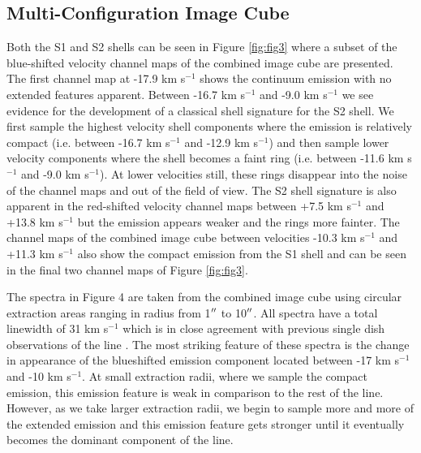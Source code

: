 \documentclass[preprint2]{aastex}
\begin{document}
\subsection{Multi-Configuration Image Cube} \label{results2} 

Both the S1 and S2 shells can be seen in Figure \ref{fig:fig3} where a subset of the blue-shifted velocity channel maps of the combined image cube are presented. The first channel map at -17.9 km s${}^{-1}$ shows the continuum emission with no extended features apparent. Between -16.7 km s${}^{-1}$ and -9.0 km s${}^{-1}$ we see evidence for the development of a classical shell signature for the S2 shell. We first sample the highest velocity shell components where the emission is relatively compact (i.e. between -16.7 km s${}^{-1}$ and -12.9 km s${}^{-1}$) and then sample lower velocity components where the shell becomes a faint ring (i.e. between -11.6 km s${}^{-1}$ and -9.0 km s${}^{-1}$). At lower velocities still, these rings disappear into the noise of the channel maps and out of the field of view. The S2 shell signature is also apparent in the red-shifted velocity channel maps between +7.5 km s${}^{-1}$ and +13.8 km s${}^{-1}$ but the emission appears weaker and the rings more fainter. The channel maps of the combined image cube between velocities -10.3 km s${}^{-1}$ and +11.3 km s${}^{-1}$ also show the compact emission from the S1 shell and can be seen in the final two channel maps of Figure \ref{fig:fig3}. 

The spectra in Figure 4 are taken from the combined image cube using circular extraction areas ranging in radius from 1$\mbox{$^{\prime\prime}$}$ to 10$\mbox{$^{\prime\prime}$}$. All spectra have a total linewidth of 31 km s${}^{-1}$ which is in close agreement with previous single dish observations of the line \citep{1980ApJ...242L..25K, 1987ApJ...313..400H, 1994ApJ...424L.127H}. The most striking feature of these spectra is the change in appearance of the blueshifted emission component located between -17 km s${}^{-1}$ and -10 km s${}^{-1}$.  At small extraction radii, where we sample the compact emission, this emission feature is weak in comparison to the rest of the line. However, as we take larger extraction radii, we begin to sample more and more of the extended emission and this emission feature gets stronger until it eventually becomes the dominant component of the line. 
\end{document}
